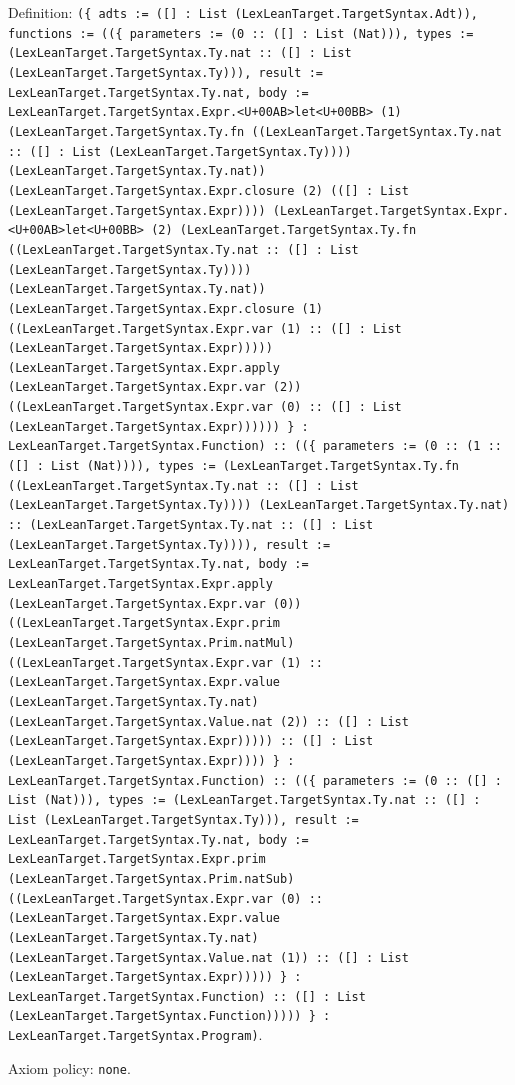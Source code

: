 \documentclass[11pt]{article}
\begin{document}
\noindent Definition: \texttt{(\{ adts := ([] : List (LexLeanTarget.TargetSyntax.Adt)), functions := ((\{ parameters := (0 :: ([] : List (Nat))), types := (LexLeanTarget.TargetSyntax.Ty.nat :: ([] : List (LexLeanTarget.TargetSyntax.Ty))), result := LexLeanTarget.TargetSyntax.Ty.nat, body := LexLeanTarget.TargetSyntax.Expr.<U+00AB>let<U+00BB> (1) (LexLeanTarget.TargetSyntax.Ty.fn ((LexLeanTarget.TargetSyntax.Ty.nat :: ([] : List (LexLeanTarget.TargetSyntax.Ty)))) (LexLeanTarget.TargetSyntax.Ty.nat)) (LexLeanTarget.TargetSyntax.Expr.closure (2) (([] : List (LexLeanTarget.TargetSyntax.Expr)))) (LexLeanTarget.TargetSyntax.Expr.<U+00AB>let<U+00BB> (2) (LexLeanTarget.TargetSyntax.Ty.fn ((LexLeanTarget.TargetSyntax.Ty.nat :: ([] : List (LexLeanTarget.TargetSyntax.Ty)))) (LexLeanTarget.TargetSyntax.Ty.nat)) (LexLeanTarget.TargetSyntax.Expr.closure (1) ((LexLeanTarget.TargetSyntax.Expr.var (1) :: ([] : List (LexLeanTarget.TargetSyntax.Expr))))) (LexLeanTarget.TargetSyntax.Expr.apply (LexLeanTarget.TargetSyntax.Expr.var (2)) ((LexLeanTarget.TargetSyntax.Expr.var (0) :: ([] : List (LexLeanTarget.TargetSyntax.Expr)))))) \} : LexLeanTarget.TargetSyntax.Function) :: ((\{ parameters := (0 :: (1 :: ([] : List (Nat)))), types := (LexLeanTarget.TargetSyntax.Ty.fn ((LexLeanTarget.TargetSyntax.Ty.nat :: ([] : List (LexLeanTarget.TargetSyntax.Ty)))) (LexLeanTarget.TargetSyntax.Ty.nat) :: (LexLeanTarget.TargetSyntax.Ty.nat :: ([] : List (LexLeanTarget.TargetSyntax.Ty)))), result := LexLeanTarget.TargetSyntax.Ty.nat, body := LexLeanTarget.TargetSyntax.Expr.apply (LexLeanTarget.TargetSyntax.Expr.var (0)) ((LexLeanTarget.TargetSyntax.Expr.prim (LexLeanTarget.TargetSyntax.Prim.natMul) ((LexLeanTarget.TargetSyntax.Expr.var (1) :: (LexLeanTarget.TargetSyntax.Expr.value (LexLeanTarget.TargetSyntax.Ty.nat) (LexLeanTarget.TargetSyntax.Value.nat (2)) :: ([] : List (LexLeanTarget.TargetSyntax.Expr))))) :: ([] : List (LexLeanTarget.TargetSyntax.Expr)))) \} : LexLeanTarget.TargetSyntax.Function) :: ((\{ parameters := (0 :: ([] : List (Nat))), types := (LexLeanTarget.TargetSyntax.Ty.nat :: ([] : List (LexLeanTarget.TargetSyntax.Ty))), result := LexLeanTarget.TargetSyntax.Ty.nat, body := LexLeanTarget.TargetSyntax.Expr.prim (LexLeanTarget.TargetSyntax.Prim.natSub) ((LexLeanTarget.TargetSyntax.Expr.var (0) :: (LexLeanTarget.TargetSyntax.Expr.value (LexLeanTarget.TargetSyntax.Ty.nat) (LexLeanTarget.TargetSyntax.Value.nat (1)) :: ([] : List (LexLeanTarget.TargetSyntax.Expr))))) \} : LexLeanTarget.TargetSyntax.Function) :: ([] : List (LexLeanTarget.TargetSyntax.Function))))) \} : LexLeanTarget.TargetSyntax.Program)}.\par
\noindent Axiom policy: \texttt{none}.\par
\end{document}
